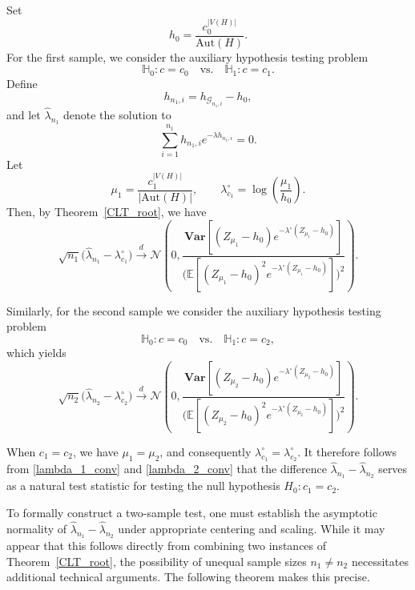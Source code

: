\documentclass[12pt]{article}
\def\H{\mathbb{H}}
\numberwithin{equation}{section}
\begin{document}
Set
\[
h_0 = \frac{c_0^{|V(H)|}}{\mathrm{Aut}(H)} .
\]
For the first sample, we consider the auxiliary hypothesis testing problem
\[
\H_0: c = c_0 \quad \text{vs.} \quad \H_1: c = c_1 .
\]
Define
\[
h_{n_1,i} = h_{\mathcal{G}_{n_1,i}} - h_0 ,
\]
and let $\hat{\lambda}_{n_1}$ denote the solution to
\[
\sum_{i=1}^{n_1} h_{n_1,i} e^{-\lambda h_{n_1,i}} = 0 .
\]
Let
\[
\mu_1 = \frac{c_1^{|V(H)|}}{\lvert \mathrm{Aut}(H) \rvert},
\qquad
\lambda^{\circ}_{c_1} = \log\left( \frac{\mu_1}{h_0} \right).
\]
Then, by Theorem~\ref{CLT_root}, we have
\begin{equation}
\sqrt{n_1}\bigl(\hat{\lambda}_{n_1} - \lambda_{c_1}^{\circ}\bigr)
\xrightarrow{d}
\mathcal{N}\!\left(
0,
\frac{\mathbf{Var}\!\left[(Z_{\mu_1}-h_0)e^{-\lambda^{\circ}(Z_{\mu_1}-h_0)}\right]}
{\bigl(\mathbb{E}\!\left[(Z_{\mu_1}-h_0)^2 e^{-\lambda^{\circ}(Z_{\mu_1}-h_0)}\right]\bigr)^2}
\right).
\label{lambda_1_conv}
\end{equation}

Similarly, for the second sample we consider the auxiliary hypothesis testing
problem
\[
\H_0: c = c_0 \quad \text{vs.} \quad \H_1: c = c_2 ,
\]
which yields
\begin{equation}
\sqrt{n_2}\bigl(\hat{\lambda}_{n_2} - \lambda_{c_2}^{\circ}\bigr)
\xrightarrow{d}
\mathcal{N}\!\left(
0,
\frac{\mathbf{Var}\!\left[(Z_{\mu_2}-h_0)e^{-\lambda^{\circ}(Z_{\mu_2}-h_0)}\right]}
{\bigl(\mathbb{E}\!\left[(Z_{\mu_2}-h_0)^2 e^{-\lambda^{\circ}(Z_{\mu_2}-h_0)}\right]\bigr)^2}
\right).
\label{lambda_2_conv}
\end{equation}

When $c_1 = c_2$, we have $\mu_1 = \mu_2$, and consequently
$\lambda^{\circ}_{c_1} = \lambda^{\circ}_{c_2}$. It therefore follows from
\eqref{lambda_1_conv} and \eqref{lambda_2_conv} that the difference
$\hat{\lambda}_{n_1} - \hat{\lambda}_{n_2}$ serves as a natural test statistic
for testing the null hypothesis $H_0: c_1 = c_2$.

To formally construct a two-sample test, one must establish the asymptotic
normality of $\hat{\lambda}_{n_1} - \hat{\lambda}_{n_2}$ under appropriate
centering and scaling. While it may appear that this follows directly from
combining two instances of Theorem~\ref{CLT_root}, the possibility of unequal
sample sizes $n_1 \neq n_2$ necessitates additional technical arguments. The
following theorem makes this precise.
\end{document}
